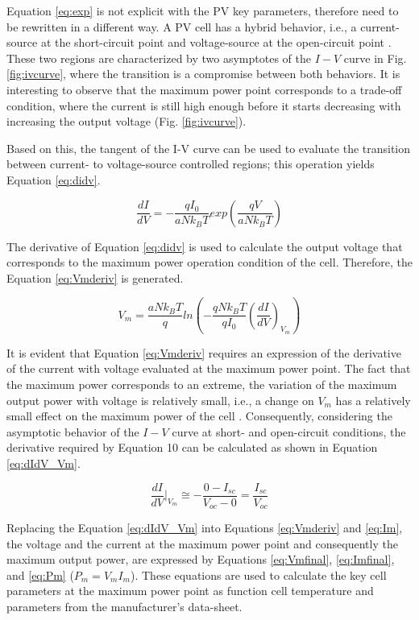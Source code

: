 Equation \ref{eq:exp} is not explicit with the PV key parameters, therefore need to be rewritten in a different way. A PV cell has a hybrid behavior, i.e., a current-source at the short-circuit point and voltage-source at the open-circuit point \cite{Saloux}. These two regions are characterized by two asymptotes of the $ I-V $ curve in Fig. \ref{fig:ivcurve}, where the transition is a compromise between both behaviors. It is interesting to observe that the maximum power point corresponds to a trade-off condition, where the current is still high enough before it starts decreasing with increasing the output voltage (Fig. \ref{fig:ivcurve}).

Based on this, the tangent of the I-V curve can be used to evaluate the transition between current- to voltage-source controlled regions; this operation yields Equation \ref{eq:didv}.

\begin{equation}
\label{eq:didv}
\dfrac{dI}{dV}=-\dfrac{qI_{0}}{aNk_{B}T}exp \left( \dfrac{qV}{aNk_{B}T}  \right) 
\end{equation}

The derivative of Equation \ref{eq:didv} is used to calculate the output voltage that corresponds to the maximum power operation condition of the cell. Therefore, the Equation \ref{eq:Vmderiv} is generated.

\begin{equation}
\label{eq:Vmderiv}
V_{m}=\dfrac{aNk_{B}T}{q} ln \left( -\dfrac{qNk_{B}T}{qI_{0}} \left( \dfrac{dI}{dV}  \right)_{V_{m}}   \right) 
\end{equation}

It is evident that Equation \ref{eq:Vmderiv} requires an expression of the derivative of the current with voltage evaluated at the maximum power point. The fact that the maximum power corresponds to an extreme, the variation of the maximum output power with voltage is relatively small, i.e., a change on $ V_{m} $ has a relatively small effect on the maximum power of the cell \cite{Saloux}. Consequently, considering the asymptotic behavior of the $I-V$ curve at short- and open-circuit conditions, the derivative required by Equation 10 can be calculated as shown in Equation \ref{eq:dIdV_Vm}.

\begin{equation}
\label{eq:dIdV_Vm}
\dfrac{dI}{dV}\vert_{V_{m}} \cong -\dfrac{0-I_{sc}}{V_{oc}-0}=\dfrac{I_{sc}}{V_{oc}}
\end{equation}

Replacing the Equation \ref{eq:dIdV_Vm} into Equations \ref{eq:Vmderiv} and \ref{eq:Im}, the voltage and the current at the maximum power point and consequently the maximum output power, are expressed by Equations \ref{eq:Vmfinal}, \ref{eq:Imfinal}, and \ref{eq:Pm} ($ P_{m}=V_{m}I_{m} $). These equations are used to calculate the key cell parameters at the maximum power point as function cell temperature and parameters from the manufacturer's data-sheet.

